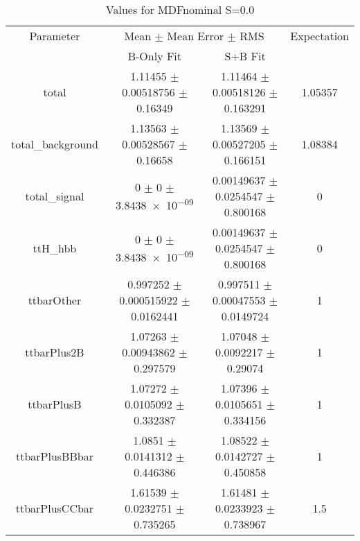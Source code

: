\begin{table}
\centering
\caption{Values for MDFnominal S=0.0}
\begin{tabular}{cccc}
\toprule
Parameter & \multicolumn{2}{c}{Mean $\pm$ Mean Error $\pm$ RMS} & Expectation\\
 & B-Only Fit & S+B Fit & \\
\midrule
total & \num{1.11455} $\pm$ \num{0.00518756} $\pm$ \num{0.16349} & \num{1.11464} $\pm$ \num{0.00518126} $\pm$ \num{0.163291} & \num{1.05357}\\
total\_background & \num{1.13563} $\pm$ \num{0.00528567} $\pm$ \num{0.16658} & \num{1.13569} $\pm$ \num{0.00527205} $\pm$ \num{0.166151} & \num{1.08384}\\
total\_signal & \num{0} $\pm$ \num{0} $\pm$ \num{3.8438e-09} & \num{0.00149637} $\pm$ \num{0.0254547} $\pm$ \num{0.800168} & \num{0}\\
ttH\_hbb & \num{0} $\pm$ \num{0} $\pm$ \num{3.8438e-09} & \num{0.00149637} $\pm$ \num{0.0254547} $\pm$ \num{0.800168} & \num{0}\\
ttbarOther & \num{0.997252} $\pm$ \num{0.000515922} $\pm$ \num{0.0162441} & \num{0.997511} $\pm$ \num{0.00047553} $\pm$ \num{0.0149724} & \num{1}\\
ttbarPlus2B & \num{1.07263} $\pm$ \num{0.00943862} $\pm$ \num{0.297579} & \num{1.07048} $\pm$ \num{0.0092217} $\pm$ \num{0.29074} & \num{1}\\
ttbarPlusB & \num{1.07272} $\pm$ \num{0.0105092} $\pm$ \num{0.332387} & \num{1.07396} $\pm$ \num{0.0105651} $\pm$ \num{0.334156} & \num{1}\\
ttbarPlusBBbar & \num{1.0851} $\pm$ \num{0.0141312} $\pm$ \num{0.446386} & \num{1.08522} $\pm$ \num{0.0142727} $\pm$ \num{0.450858} & \num{1}\\
ttbarPlusCCbar & \num{1.61539} $\pm$ \num{0.0232751} $\pm$ \num{0.735265} & \num{1.61481} $\pm$ \num{0.0233923} $\pm$ \num{0.738967} & \num{1.5}\\
\bottomrule
\end{tabular}
\end{table}